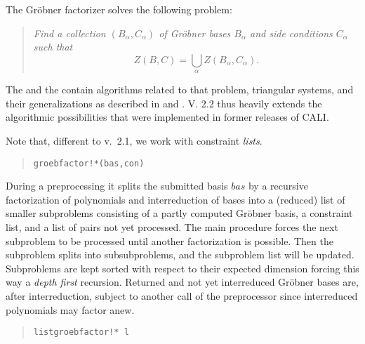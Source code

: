The Gr\"obner factorizer solves the following problem:
\begin{quote}
\it Find a collection $(B_\alpha,C_\alpha)$ of Gr\"obner bases $B_\alpha$
and side conditions $C_\alpha$ such that 
\[Z(B,C) = \bigcup_\alpha Z(B_\alpha,C_\alpha).\]
\end{quote}
The  and the  contain algorithms
related to that problem, triangular systems, and their generalizations
as described in \cite{fgb} and \cite{efgb}. V. 2.2 thus heavily
extends the algorithmic possibilities that were implemented in former
releases of CALI. 

Note that, different to v.\ 2.1, we work with constraint \emph{lists}.
\begin{quote}
\verb|groebfactor!*(bas,con)|

\end{quote}
During a preprocessing it splits the submitted basis $bas$ by a
recursive factorization of polynomials and interreduction of bases
into a (reduced) list of smaller subproblems consisting of a partly
computed Gr\"obner basis, a constraint list, and a list of pairs not yet
processed. The main procedure forces the next subproblem to be
processed until another factorization is possible. Then the
subproblem splits into subsubproblems, and the subproblem list will
be updated. Subproblems are kept sorted with respect to their
expected dimension  forcing this way a \emph{depth first}
recursion.  Returned and not yet interreduced Gr\"obner bases are, after
interreduction, subject to another call of the preprocessor since
interreduced polynomials may factor anew.
\begin{quote}
\verb|listgroebfactor!* l| 

\end{quote}
\medskip

